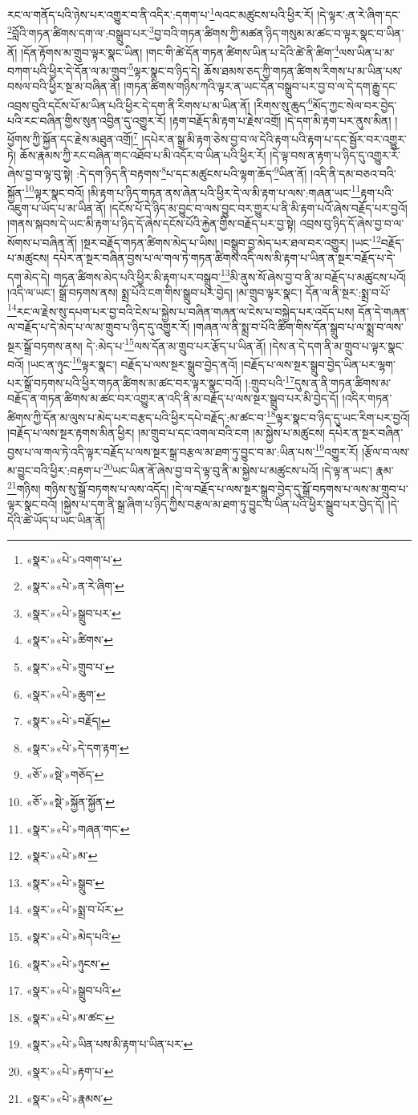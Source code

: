 རང་ལ་གནོད་པའི་ཉེས་པར་འགྱུར་བ་ནི་འདིར་:དགག་པ་\footnote{«སྣར་»«པེ་»འགག་པ་}ལའང་མཚུངས་པའི་ཕྱིར་རོ། །དེ་ལྟར་:ན་རེ་ཞིག་དང་\footnote{«སྣར་»«པེ་»ན་རེ་ཞིག་}བློའི་གཏན་ཚིགས་དག་ལ་:བསྒྲུབ་པར་\footnote{«སྣར་»«པེ་»སྒྲུབ་པར་}བྱ་བའི་གཏན་ཚིགས་ཀྱི་མཚན་ཉིད་གསུམ་མ་ཚང་བ་ལྟར་སྣང་བ་ཡིན་ནོ། །དོན་རྟོགས་མ་གྲུབ་ལྟར་སྣང་ཡིན། །གང་གི་ཚེ་དོན་གཏན་ཚིགས་ཡིན་པ་དེའི་ཚེ་ནི་ཚིག་\footnote{«སྣར་»«པེ་»ཚིགས་}ལས་ཡིན་པ་མ་བཀག་པའི་ཕྱིར་དེ་དོན་ལ་མ་གྲུབ་\footnote{«སྣར་»«པེ་»གྲུབ་པ་}ལྟར་སྣང་བ་ཉིད་དེ། ཆོས་ཐམས་ཅད་ཀྱི་གཏན་ཚིགས་རིགས་པ་མ་ཡིན་པས་བསལ་བའི་ཕྱིར་སྔ་མ་བཞིན་ནོ། །གཏན་ཚིགས་གཉིས་ཀའི་ལྟར་ན་ཡང་དོན་བསྒྲུབ་པར་བྱ་བ་ལ་དེ་དག་རྒྱུ་དང་འབྲས་བུའི་དངོས་པོ་མ་ཡིན་པའི་ཕྱིར་དེ་དག་ནི་རིགས་པ་མ་ཡིན་ནོ། །རིགས་སུ་ཆུད་\footnote{«སྣར་»«པེ་»ཆུག་}མོད་ཀྱང་སེལ་བར་བྱེད་པའི་རང་བཞིན་གྱིས་སུན་འབྱིན་དུ་འགྱུར་རོ། །རྟག་བརྗོད་མི་རྟག་པ་རྗེས་འགྲོ། །དེ་དག་མི་རྟག་པར་ནུས་མིན། །ཕྱོགས་ཀྱི་སྐྱོན་དང་རྗེས་མཐུན་འགྲོ།\footnote{«སྣར་»«པེ་»བརྗོད།} །དཔེར་ན་སྒྲ་མི་རྟག་ཅེས་བྱ་བ་ལ་དེའི་རྟག་པའི་རྟག་པ་དང་སྦྱོར་བར་འགྱུར་ཏེ། ཆོས་རྣམས་ཀྱི་རང་བཞིན་གང་འཐོབ་པ་མི་འདོར་བ་ཡིན་པའི་ཕྱིར་རོ། །དེ་ལྟ་བས་ན་རྟག་པ་ཉིད་དུ་འགྱུར་རོ་ཞེས་བྱ་བ་ལྟ་བུ་སྟེ། :དེ་དག་ཉིད་ནི་བརྟགས་\footnote{«སྣར་»«པེ་»དེ་དག་རྟག་}པ་དང་མཚུངས་པའི་ལྟག་ཆོད་\footnote{«ཅོ་»«སྡེ་»གཅོད་}ཡིན་ནོ། །འདི་ནི་དམ་བཅའ་བའི་སྐྱོན་\footnote{«ཅོ་»«སྡེ་»སྐྱོན་སྐྱོན་}ལྟར་སྣང་བའོ། །མི་རྟག་པ་ཉིད་གཏན་ནས་ཞེན་པའི་ཕྱིར་དེ་ལ་མི་རྟག་པ་ལས་:གཞན་ཡང་\footnote{«སྣར་»«པེ་»གཞན་གང་}རྟག་པའི་འཇུག་པ་ཡོད་པ་མ་ཡིན་ནོ། །དངོས་པོ་དེ་ཉིད་མ་བྱུང་བ་ལས་བྱུང་བར་གྱུར་པ་ནི་མི་རྟག་པའོ་ཞེས་བརྗོད་པར་བྱའོ། །གནས་སྐབས་དེ་ཡང་མི་རྟག་པ་ཉིད་དོ་ཞེས་དངོས་པོའི་རྐྱེན་གྱིས་བརྗོད་པར་བྱ་སྟེ། འབྲས་བུ་ཉིད་དོ་ཞེས་བྱ་བ་ལ་སོགས་པ་བཞིན་ནོ། །སྔར་བརྗོད་གཏན་ཚིགས་མེད་པ་ཡིས། །བསྒྲུབ་བྱ་མེད་པར་ཐལ་བར་འགྱུར། །ཡང་\footnote{«སྣར་»«པེ་»མ་}བརྗོད་པ་མཚུངས། དཔེར་ན་སྔར་བཞིན་བྱས་པ་ལ་གལ་ཏེ་གཏན་ཚིགས་འདི་ལས་མི་རྟག་པ་ཡིན་ན་སྔར་བརྗོད་པ་དེ་དག་མེད་དེ། གཏན་ཚིགས་མེད་པའི་ཕྱིར་མི་རྟག་པར་བསྒྲུབ་\footnote{«སྣར་»«པེ་»སྒྲུབ་}མི་ནུས་སོ་ཞེས་བྱ་བ་ནི་མ་བརྗོད་པ་མཚུངས་པའོ། །འདི་ལ་ཡང་། སྒྲོ་བཏགས་ནས། སྨྲ་པོའི་ངག་གིས་སྒྲུབ་པར་བྱེད། །མ་གྲུབ་ལྟར་སྣང་། དོན་ལ་ནི་སྔར་:སྨྲ་བ་པོ་\footnote{«སྣར་»«པེ་»སྨྲ་བ་པོར་}རང་ལ་རྗེས་སུ་དཔག་པར་བྱ་བའི་ངེས་པ་སྐྱེས་པ་བཞིན་གཞན་ལ་ངེས་པ་བསྐྱེད་པར་འདོད་པས། དོན་དེ་གཞན་ལ་བརྗོད་པ་དེ་མེད་པ་ལ་མ་གྲུབ་པ་ཉིད་དུ་འགྱུར་རོ། །གཞན་ལ་ནི་སྨྲ་བ་པོའི་ཚིག་གིས་དོན་སྒྲུབ་པ་ལ་སྨྲ་བ་ལས་སྔར་སྒྲོ་བཏགས་ནས། དེ་:མེད་པ་\footnote{«སྣར་»«པེ་»མེད་པའི་}ལས་དོན་མ་གྲུབ་པར་རྩོད་པ་ཡིན་ནོ། །དེས་ན་དེ་དག་ནི་མ་གྲུབ་པ་ལྟར་སྣང་བའོ། །ཡང་ན་ཉུང་\footnote{«སྣར་»«པེ་»ཉུངས་}ལྟར་སྣང་། བརྗོད་པ་ལས་སྔར་སྒྲུབ་བྱེད་ནའོ། །བརྗོད་པ་ལས་སྔར་སྒྲུབ་བྱེད་ཡིན་པར་ལྷག་པར་སྒྲོ་བཏགས་པའི་ཕྱིར་གཏན་ཚིགས་མ་ཚང་བར་ལྟར་སྣང་བའོ། །:གྲུབ་པའི་\footnote{«སྣར་»«པེ་»སྒྲུབ་པའི་}དུས་ན་ནི་གཏན་ཚིགས་མ་བརྗོད་ན་གཏན་ཚིགས་མ་ཚང་བར་འགྱུར་ན་འདི་ནི་མ་བརྗོད་པ་ལས་སྔར་སྒྲུབ་པར་མི་བྱེད་དོ། །འདིར་གཏན་ཚིགས་ཀྱི་དོན་མ་ལུས་པ་མེད་པར་བརྩད་པའི་ཕྱིར་དཔེ་བརྗོད་:མ་ཚང་བ་\footnote{«སྣར་»«པེ་»མ་ཚང་}ལྟར་སྣང་བ་ཉིད་དུ་ཡང་རིག་པར་བྱའོ། །བརྗོད་པ་ལས་སྔར་རྟགས་མིན་ཕྱིར། །མ་གྲུབ་པ་དང་འགལ་བའི་ངག །མ་སྐྱེས་པ་མཚུངས། དཔེར་ན་སྔར་བཞིན་བྱས་པ་ལ་གལ་ཏེ་འདི་ལྟར་བརྗོད་པ་ལས་སྔར་སྒྲ་བརྩལ་མ་ཐག་ཏུ་བྱུང་བ་མ་:ཡིན་པས་\footnote{«སྣར་»«པེ་»ཡིན་པས་མི་རྟག་པ་ཡིན་པར་}འགྱུར་རོ། །རྩོལ་བ་ལས་མ་བྱུང་བའི་ཕྱིར་:བརྟག་པ་\footnote{«སྣར་»«པེ་»རྟག་པ་}ཡང་ཡིན་ནོ་ཞེས་བྱ་བ་དེ་ལྟ་བུ་ནི་མ་སྐྱེས་པ་མཚུངས་པའོ། །དེ་ལྟ་ན་ཡང་། རྣམ་\footnote{«སྣར་»«པེ་»རྣམས་}གཉིས། གཉིས་སུ་སྒྲོ་བཏགས་པ་ལས་འདོད། །དེ་ལ་བརྗོད་པ་ལས་སྔར་སྒྲུབ་བྱེད་དུ་སྒྲོ་བཏགས་པ་ལས་མ་གྲུབ་པ་ལྟར་སྣང་བའོ། །སྐྱེས་པ་དག་ནི་སྒྲ་ཞིག་པ་ཉིད་ཀྱིས་བརྩལ་མ་ཐག་ཏུ་བྱུང་བ་ཡིན་པའི་ཕྱིར་སྒྲུབ་པར་བྱེད་དོ། །དེ་དེའི་ཚེ་ཡོད་པ་ཡང་ཡིན་ནོ། 